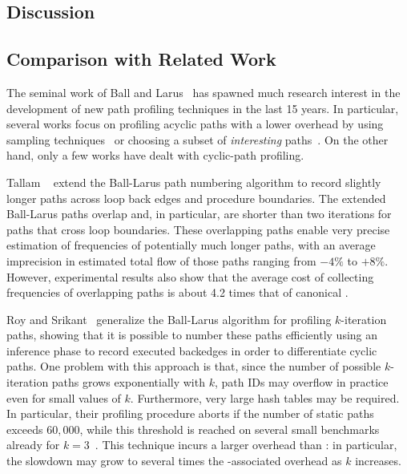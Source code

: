 
\subsection{Discussion}

\missing


\subsection{Comparison with Related Work}

The seminal work of Ball and Larus~\cite{Ball96} has spawned much research interest in the development of new path profiling techniques in the last 15 years. In particular, several works focus on profiling acyclic paths with a lower overhead by using sampling techniques~\cite{Bond05,Bond05b} or choosing a subset of {\em interesting} paths~\cite{Apiwattanapong02,Joshi04,Vaswani07}.
On the other hand, only a few works have dealt with cyclic-path profiling.

Tallam \etal~\cite{Tallam04} extend the Ball-Larus path numbering algorithm to record slightly longer paths across loop back edges and procedure boundaries. The extended Ball-Larus paths overlap and, in particular, are shorter than two iterations for paths that cross loop boundaries. These overlapping paths enable very precise estimation of frequencies of potentially much longer paths, with an average imprecision in estimated total flow of those paths ranging from $-4\%$ to $+8\%$. However, experimental results also show that the average cost of collecting frequencies of overlapping paths is about 4.2 times that of canonical \blpp.

Roy and Srikant~\cite{Roy09} generalize the Ball-Larus algorithm for profiling $k$-iteration paths, showing that it is possible to number these paths efficiently using an inference phase to record executed backedges in order to differentiate cyclic paths. One problem with this approach is that, since the number of possible $k$-iteration paths grows exponentially with $k$, path IDs may overflow in practice even for small values of $k$. Furthermore, very large hash tables may be required. In particular, their profiling procedure aborts if the number of static paths exceeds $60,000$, while this threshold is reached on several small benchmarks already for $k=3$~\cite{Li12}. This technique incurs a larger overhead than \blpp: in particular, the slowdown may grow to several times the \blpp-associated overhead as $k$ increases.

